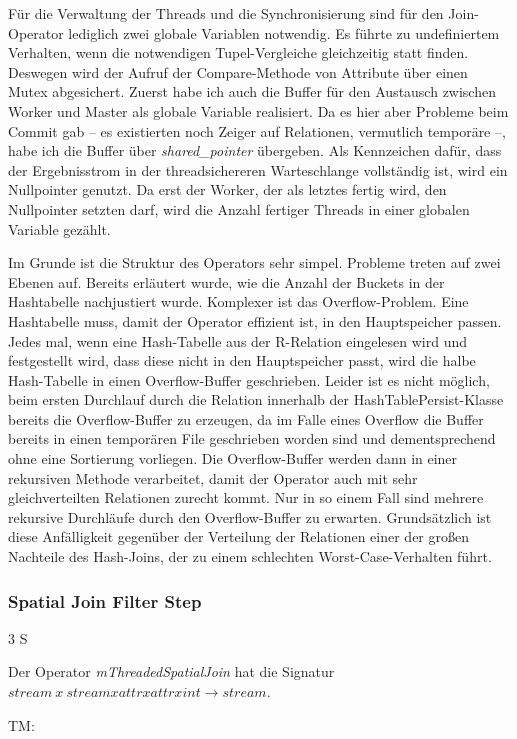 \documentclass[a4paper,12pt,twoside]{article}
\newcommand{\Fb}[1]{\textit{#1}} %
\begin{document}
Für die Verwaltung der Threads und die Synchronisierung sind für den Join-Operator lediglich zwei globale Variablen notwendig. Es führte zu undefiniertem Verhalten, wenn die notwendigen Tupel-Vergleiche gleichzeitig statt finden. Deswegen wird der Aufruf der Compare-Methode von Attribute über einen Mutex abgesichert. Zuerst habe ich auch die Buffer für den Austausch zwischen Worker und Master als globale Variable realisiert. Da es hier aber Probleme beim Commit gab -- es existierten noch Zeiger auf Relationen, vermutlich temporäre --, habe ich die Buffer über \Fb{shared\_pointer} übergeben. Als Kennzeichen dafür, dass der Ergebnisstrom in der threadsichereren Warteschlange vollständig ist, wird ein Nullpointer genutzt. Da erst der Worker, der als letztes fertig wird, den Nullpointer setzten darf, wird die Anzahl fertiger Threads in einer globalen Variable gezählt.
 
Im Grunde ist die Struktur des Operators sehr simpel. Probleme treten auf zwei Ebenen auf. Bereits erläutert wurde, wie die Anzahl der Buckets in der Hashtabelle nachjustiert wurde. Komplexer ist das Overflow-Problem. Eine Hashtabelle muss, damit der Operator effizient ist, in den Hauptspeicher passen. Jedes mal, wenn eine Hash-Tabelle aus der R-Relation eingelesen wird und festgestellt wird, dass diese nicht in den Hauptspeicher passt, wird die halbe Hash-Tabelle in einen Overflow-Buffer geschrieben. Leider ist es nicht möglich, beim ersten Durchlauf durch die Relation innerhalb der HashTablePersist-Klasse bereits die Overflow-Buffer zu erzeugen, da im Falle eines Overflow die Buffer bereits in einen temporären File geschrieben worden sind und dementsprechend ohne eine Sortierung vorliegen. Die Overflow-Buffer werden dann in einer rekursiven Methode verarbeitet, damit der Operator auch mit sehr gleichverteilten Relationen zurecht kommt. Nur in so einem Fall sind mehrere rekursive Durchläufe durch den Overflow-Buffer zu erwarten. Grundsätzlich ist diese Anfälligkeit gegenüber der Verteilung der Relationen einer der großen Nachteile des Hash-Joins, der zu einem schlechten Worst-Case-Verhalten führt.

\subsubsection{Spatial Join Filter Step} 3 S

Der Operator \Fb{mThreadedSpatialJoin} hat die Signatur $stream~x~stream x attr x attr x int \longrightarrow stream$.


TM:
\end{document}
